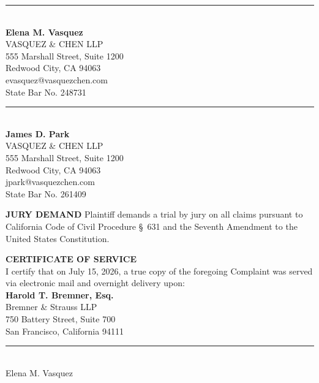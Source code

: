 \documentclass[12pt,letterpaper]{article}
\begin{document}
\noindent\begin{minipage}[t]{0.48\textwidth}
  \RaggedRight
  \rule{2.6in}{0.4pt}\\[4pt]
  {\footnotesize\bfseries Elena M. Vasquez}\\[1pt]
  {\footnotesize\color{LineGray} VASQUEZ \& CHEN LLP}\\[1pt]
  {\footnotesize\color{LineGray} 555 Marshall Street, Suite 1200}\\[1pt]
  {\footnotesize\color{LineGray} Redwood City, CA 94063}\\[1pt]
  {\footnotesize\color{LineGray} evasquez@vasquezchen.com}\\[1pt]
  {\footnotesize\color{LineGray} State Bar No. 248731}
\end{minipage}
\hfill
\begin{minipage}[t]{0.48\textwidth}
  \RaggedRight
  \rule{2.6in}{0.4pt}\\[4pt]
  {\footnotesize\bfseries James D. Park}\\[1pt]
  {\footnotesize\color{LineGray} VASQUEZ \& CHEN LLP}\\[1pt]
  {\footnotesize\color{LineGray} 555 Marshall Street, Suite 1200}\\[1pt]
  {\footnotesize\color{LineGray} Redwood City, CA 94063}\\[1pt]
  {\footnotesize\color{LineGray} jpark@vasquezchen.com}\\[1pt]
  {\footnotesize\color{LineGray} State Bar No. 261409}
\end{minipage}


\vspace{4pt}

\begin{tcolorbox}[emphasisbox]
  {\footnotesize\bfseries\color{CourtBlue} JURY DEMAND}
  \vspace{1pt}
  {\footnotesize Plaintiff demands a trial by jury on all claims pursuant to California Code of Civil Procedure \S\ 631 and the Seventh Amendment to the United States Constitution.}
\end{tcolorbox}

\vspace{6pt}

\begin{tcolorbox}[emphasisbox]
  {\footnotesize\bfseries\color{CourtBlue} CERTIFICATE OF SERVICE}\\[3pt]
  {\footnotesize I certify that on July 15, 2026, a true copy of the foregoing Complaint was served via electronic mail and overnight delivery upon:}\\[3pt]
  {\footnotesize\bfseries Harold T. Bremner, Esq.}\\
  {\footnotesize Bremner \& Strauss LLP}\\
  {\footnotesize 750 Battery Street, Suite 700}\\
  {\footnotesize San Francisco, California 94111}\\[4pt]
  \rule{2.2in}{0.4pt}\\[3pt]
  {\footnotesize Elena M. Vasquez}
\end{tcolorbox}
\end{document}
